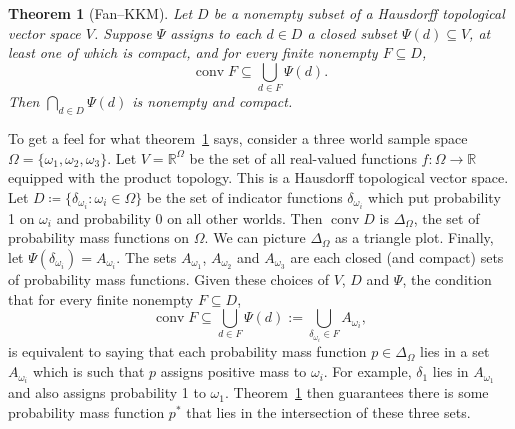 \documentclass[11pt]{article}
\newtheorem{theorem}{Theorem}[section]
\theoremstyle{definition}
\theoremstyle{remark}
\begin{document}
\begin{theorem}[Fan--KKM]\label{thm:fan-kkm}
Let $D$ be a nonempty subset of a Hausdorff topological vector space $V$. Suppose $\Psi$ assigns to each $d\in D$ a closed subset $\Psi(d)\subseteq V$, at least one of which is compact, and for every finite nonempty $F\subseteq D$,
\[
\operatorname{conv}F\subseteq\bigcup_{d\in F}\Psi(d).
\]
Then $\bigcap_{d\in D}\Psi(d)$ is nonempty and compact.
\end{theorem}


To get a feel for what theorem~\ref{thm:fan-kkm} says, consider a three world sample space $\Omega=\{\omega_1,\omega_2,\omega_3\}$. Let $V=\mathbb R^{\Omega}$ be the set of all real-valued functions $f:\Omega\rightarrow\mathbb R$ equipped with the product topology. This is a Hausdorff topological vector space. Let $D\coloneqq\{\delta_{\omega_i}:\omega_i\in\Omega\}$ be the set of indicator functions $\delta_{\omega_i}$ which put probability 1 on $\omega_i$ and probability 0 on all other worlds. Then $\operatorname{conv}D$ is $\Delta_\Omega$, the set of probability mass functions on $\Omega$. We can picture $\Delta_\Omega$ as a triangle plot. Finally, let $\Psi(\delta_{\omega_i})=A_{\omega_i}$. The sets $A_{\omega_1}$, $A_{\omega_2}$ and $A_{\omega_3}$ are each closed (and compact) sets of probability mass functions. Given these choices of $V$, $D$ and $\Psi$, the condition that for every finite nonempty $F\subseteq D$,
\[
\operatorname{conv}F\subseteq\bigcup_{d\in F}\Psi(d):=\bigcup_{\delta_{\omega_i}\in F}A_{\omega_i},
\]
is equivalent to saying that each probability mass function $p\in\Delta_\Omega$ lies in a set $A_{\omega_i}$ which is such that $p$ assigns positive mass to $\omega_i$. For example, $\delta_1$ lies in $A_{\omega_1}$ and also assigns probability 1 to $\omega_1$. Theorem~\ref{thm:fan-kkm} then guarantees there is some probability mass function $p^*$ that lies in the intersection of these three sets.
\end{document}
